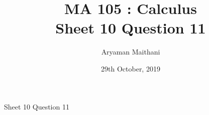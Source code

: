 \documentclass[handout, aspectratio=169]{beamer}
\title{MA 105 : Calculus\\ Sheet 10 Question 11}  %
\author{Aryaman Maithani}
\date[29-10-2019]{29th October, 2019}               %
\institute[IITB]{IIT Bombay}
\begin{document}
\begin{frame}{Sheet 10 Question 11}                            %
	
\end{frame}
\end{document}
